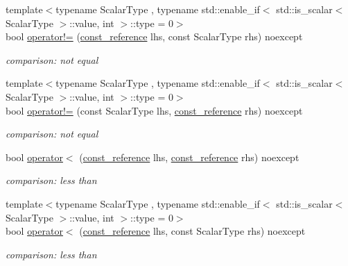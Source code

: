 \begin{DoxyCompactItemize}
{\footnotesize template$<$typename Scalar\+Type , typename std\+::enable\+\_\+if$<$ std\+::is\+\_\+scalar$<$ Scalar\+Type $>$\+::value, int $>$\+::type  = 0$>$ }\\bool \hyperlink{classnlohmann_1_1basic__json_afefc38fc08bdb7a9a7474b5ab4a1140f}{operator!=} (\hyperlink{classnlohmann_1_1basic__json_ab8a1c33ee7b154fc41ca2545aa9724e6}{const\+\_\+reference} lhs, const Scalar\+Type rhs) noexcept
\begin{DoxyCompactList}\small\item\em comparison\+: not equal \end{DoxyCompactList}\item 
{\footnotesize template$<$typename Scalar\+Type , typename std\+::enable\+\_\+if$<$ std\+::is\+\_\+scalar$<$ Scalar\+Type $>$\+::value, int $>$\+::type  = 0$>$ }\\bool \hyperlink{classnlohmann_1_1basic__json_ab0e886db6e9fa91ff9fd853333fed05b}{operator!=} (const Scalar\+Type lhs, \hyperlink{classnlohmann_1_1basic__json_ab8a1c33ee7b154fc41ca2545aa9724e6}{const\+\_\+reference} rhs) noexcept
\begin{DoxyCompactList}\small\item\em comparison\+: not equal \end{DoxyCompactList}\item 
bool \hyperlink{classnlohmann_1_1basic__json_aacd442b66140c764c594ac8ad7dfd5b3}{operator$<$} (\hyperlink{classnlohmann_1_1basic__json_ab8a1c33ee7b154fc41ca2545aa9724e6}{const\+\_\+reference} lhs, \hyperlink{classnlohmann_1_1basic__json_ab8a1c33ee7b154fc41ca2545aa9724e6}{const\+\_\+reference} rhs) noexcept
\begin{DoxyCompactList}\small\item\em comparison\+: less than \end{DoxyCompactList}\item 
{\footnotesize template$<$typename Scalar\+Type , typename std\+::enable\+\_\+if$<$ std\+::is\+\_\+scalar$<$ Scalar\+Type $>$\+::value, int $>$\+::type  = 0$>$ }\\bool \hyperlink{classnlohmann_1_1basic__json_a7999ee3a69a4979d92e98ab1e88c8759}{operator$<$} (\hyperlink{classnlohmann_1_1basic__json_ab8a1c33ee7b154fc41ca2545aa9724e6}{const\+\_\+reference} lhs, const Scalar\+Type rhs) noexcept
\begin{DoxyCompactList}\small\item\em comparison\+: less than \end{DoxyCompactList}\item 

\end{DoxyCompactItemize}
